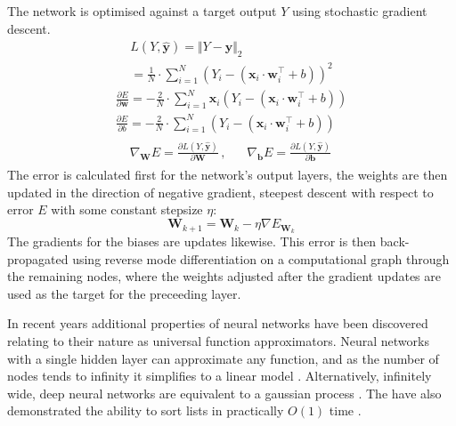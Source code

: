 The network is optimised against a target output $Y$ using stochastic gradient descent.
\begin{equation}
    \begin{gathered}
        L(Y, \mathbf{\hat{y}}) = \Vert Y - \mathbf{\hat{y}} \Vert_{2} \\
        = \frac{1}{N} \cdot \sum_{i=1}^{N} (Y_i - (\mathbf{x}_i \cdot \mathbf{w}_i^\top + b))^2
    \end{gathered}
\end{equation}
\begin{equation}
    \begin{gathered}
        \frac{\partial E}{\partial \mathbf{w}} = -\frac{2}{N} \cdot \sum_{i=1}^{N} \mathbf{x}_i(Y_i-(\mathbf{x}_i \cdot \mathbf{w}_i^\top +b)) \\
    \frac{\partial E}{\partial b} = -\frac{2}{N} \cdot \sum_{i=1}^{N} (Y_i-(\mathbf{x}_i \cdot \mathbf{w}_i^\top +b))
    \end{gathered}
\end{equation}
\begin{gather}
    \begin{aligned}
        \nabla_{\mathbf{W}} E = \frac{\partial L(Y, \mathbf{\hat{y}}) }{\partial \mathbf{W}}  \,, \;\;\; &
        \nabla_{\mathbf{b}} E = \frac{\partial L(Y, \mathbf{\hat{y}})}{\partial \mathbf{b}} \,
    \end{aligned} 
\end{gather}
The error is calculated first for the network's output layers, the weights are then updated in the direction of 
negative gradient, steepest descent with respect to error $E$ with some constant stepsize $\eta$:
\begin{equation}
    \mathbf{W}_{k+1}=\mathbf{W}_{k} - \eta \nabla E_{\mathbf{W}_k}
\end{equation}
The gradients for the biases are updates likewise. This error is then back-propagated
using reverse mode differentiation on a computational graph \cite{Margossian2019} through the remaining nodes,
where the weights adjusted after the gradient updates are used as the target for the preceeding layer.
\begin{remark}
    In recent years additional properties of neural networks have been discovered
    relating to their nature as universal function approximators. Neural networks with
    a single hidden layer can approximate any function, and as the number
    of nodes tends to infinity it simplifies to a linear model \cite{Jaehoon2019}. Alternatively, infinitely
    wide, deep neural networks are equivalent to a gaussian process \cite{Jaehoon2017}.
    The have also demonstrated the ability to sort lists in practically $O(1)$ time \cite{Xiaoke2019}.
\end{remark}
